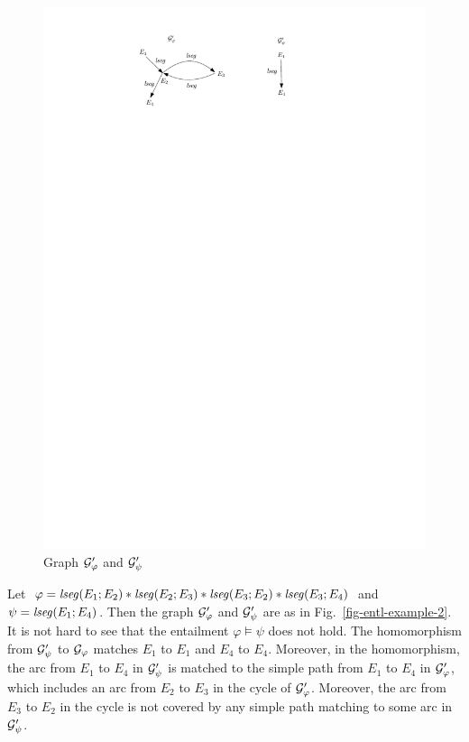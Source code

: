 \documentclass{llncs}
\begin{document}
\begin{figure}[htbp]
\begin{center}
\includegraphics[scale=0.6]{entl-example-1.pdf}
\end{center}
\caption{Graph $\mathcal{G}'_\varphi$ and $\mathcal{G}'_\psi$}\label{fig-entl-example-1}
\end{figure}


\begin{example}\label{entl-exmp-2}
Let $\varphi = \mathit{lseg}(E_1; E_2) * \mathit{lseg}(E_2; E_3) * \mathit{lseg}(E_3; E_2) * \mathit{lseg}(E_3; E_4)$ and $\psi = \mathit{lseg}(E_1; E_4)$. Then the graph $\mathcal{G}'_\varphi$ and $\mathcal{G}'_\psi$ are as in Fig.~\ref{fig-entl-example-2}.    It is not hard to see that the entailment $\varphi \models \psi$ does not hold. The homomorphism from $\mathcal{G}'_\psi$ to $\mathcal{G}_\varphi$ matches $E_1$ to $E_1$ and $E_4$ to $E_4$. Moreover, in the homomorphism, the arc from $E_1$ to $E_4$ in $\mathcal{G}'_\psi$ is matched to the simple path from $E_1$ to $E_4$ in $\mathcal{G}'_\varphi$, which includes an arc from $E_2$ to $E_3$ in the cycle of $\mathcal{G}'_\varphi$.  Moreover, the arc from $E_3$ to $E_2$ in the cycle is not covered by any simple path matching to some arc in $\mathcal{G}'_\psi$.
\end{example}
\end{document}
